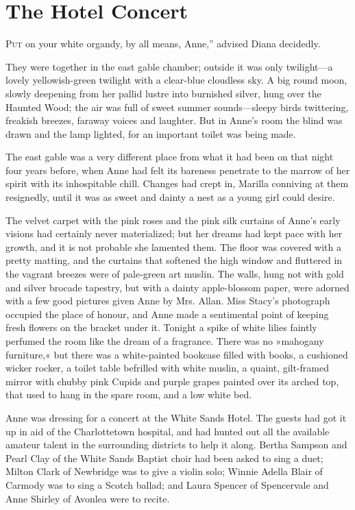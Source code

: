 \chapter{The Hotel Concert}

\lettrine[ante=“,lines=4]{P}{ut} on your white organdy, by all means, Anne,” advised Diana decidedly.

They were together in the east gable chamber; outside it was only twilight—a lovely yellowish-green twilight with a clear-blue cloudless sky. A big round moon, slowly deepening from her pallid lustre into burnished silver, hung over the Haunted Wood; the air was full of sweet summer sounds—sleepy birds twittering, freakish breezes, faraway voices and laughter. But in Anne's room the blind was drawn and the lamp lighted, for an important toilet was being made.

The east gable was a very different place from what it had been on that night four years before, when Anne had felt its bareness penetrate to the marrow of her spirit with its inhospitable chill. Changes had crept in, Marilla conniving at them resignedly, until it was as sweet and dainty a nest as a young girl could desire.

The velvet carpet with the pink roses and the pink silk curtains of Anne's early visions had certainly never materialized; but her dreams had kept pace with her growth, and it is not probable she lamented them. The floor was covered with a pretty matting, and the curtains that softened the high window and fluttered in the vagrant breezes were of pale-green art muslin. The walls, hung not with gold and silver brocade tapestry, but with a dainty apple-blossom paper, were adorned with a few good pictures given Anne by Mrs. Allan. Miss Stacy's photograph occupied the place of honour, and Anne made a sentimental point of keeping fresh flowers on the bracket under it. Tonight a spike of white lilies faintly perfumed the room like the dream of a fragrance. There was no »mahogany furniture,« but there was a white-painted bookcase filled with books, a cushioned wicker rocker, a toilet table befrilled with white muslin, a quaint, gilt-framed mirror with chubby pink Cupids and purple grapes painted over its arched top, that used to hang in the spare room, and a low white bed.

Anne was dressing for a concert at the White Sands Hotel. The guests had got it up in aid of the Charlottetown hospital, and had hunted out all the available amateur talent in the surrounding districts to help it along. Bertha Sampson and Pearl Clay of the White Sands Baptist choir had been asked to sing a duet; Milton Clark of Newbridge was to give a violin solo; Winnie Adella Blair of Carmody was to sing a Scotch ballad; and Laura Spencer of Spencervale and Anne Shirley of Avonlea were to recite.


